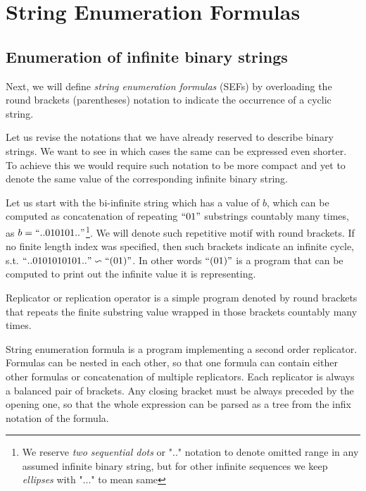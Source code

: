 \pagebreak
\section{String Enumeration Formulas}\label{sec_sef}

\subsection{Enumeration of infinite binary strings}

Next, we will define \textit{string enumeration formulas} (SEFs) by overloading the round brackets (parentheses) notation to indicate the occurrence of a cyclic string.

Let us revise the notations that we have already reserved to describe binary strings. We want to see in which cases the same can be expressed even shorter. To achieve this we would require such notation to be more compact and yet to denote the same value of the corresponding infinite binary string.

Let us start with the bi-infinite string which has a value of $b$, which can be computed as concatenation of repeating $\text{``}01\text{''}$ substrings countably many times, as $b = \text{``}..010101..\text{''}$\footnote{We reserve \textit{two sequential dots} or ".." notation to denote omitted range in any assumed infinite binary string, but for other infinite sequences we keep \textit{ellipses} with "..." to mean same}. We will denote such repetitive motif with round brackets. If no finite length index was specified, then such brackets indicate an infinite cycle, s.t. $\text{``}..0101010101..\text{''} \backsim \text{``}(01)\text{''}$. In other words $\text{``}(01)\text{''}$ is a program that can be computed to print out the infinite value it is representing.

\begin{definition}Replicator or replication operator is a simple program denoted by round brackets that repeats the finite substring value wrapped in those brackets countably many times.\end{definition}

\begin{definition}String enumeration formula is a program implementing a second order replicator. Formulas can be nested in each other, so that one formula can contain either other formulas or concatenation of multiple replicators. Each replicator is always a balanced pair of brackets. Any closing bracket must be always preceded by the opening one, so that the whole expression can be parsed as a tree from the infix notation of the formula.\end{definition}

